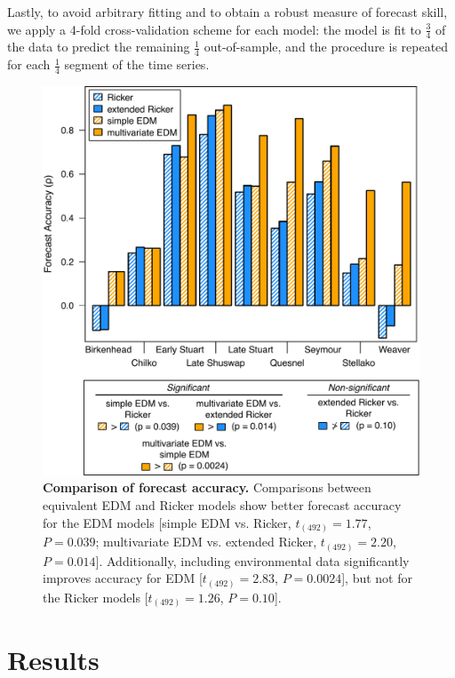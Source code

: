 Lastly, to avoid arbitrary fitting and to obtain a robust measure of forecast skill, we apply a 4-fold cross-validation scheme for each model: the model is fit to $\frac{3}{4}$ of the data to predict the remaining $\frac{1}{4}$ out-of-sample, and the procedure is repeated for each $\frac{1}{4}$ segment of the time series.

\begin{figure}[!ht]
\begin{center}\includegraphics[width=\maxwidth{\textwidth}]{fig_salmon_4.pdf}\end{center}
\caption[Comparison of forecast accuracy.]{\textbf{Comparison of forecast accuracy.}\newline
Comparisons between equivalent EDM and Ricker models show better forecast accuracy for the EDM models [simple EDM vs. Ricker, $t_{(492)} = 1.77$, $P = 0.039$; multivariate EDM vs. extended Ricker, $t_{(492)} = 2.20$, $P = 0.014$]. Additionally, including environmental data significantly improves accuracy for EDM [$t_{(492)} = 2.83$, $P = 0.0024$], but not for the Ricker models [$t_{(492)} = 1.26$, $P = 0.10$].}
\label{fig_salmon_model_comparison}
\end{figure}

\section{Results}

